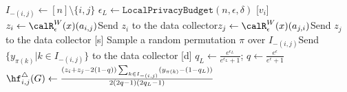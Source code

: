 \setlength{\algomargin}{5mm}
\begin{algorithm}[t]
  \SetAlgoLined
  $I_{-(i,j)} \leftarrow [n]\setminus\{i,j\}$\;
  $\epsilon_L \leftarrow \texttt{LocalPrivacyBudget}(n,\epsilon,\delta)$\;
  [$v_i$] $z_i \leftarrow \calR_{\epsilon}^W(x)(a_{i,j})$\;
  [$v_i$] Send $z_i$ to the data collector\;
  [$v_j$] $z_j \leftarrow \calR_{\epsilon}^W(x)(a_{j,i})$\;
  [$v_j$] Send $z_j$ to the data collector\;
  [s] Sample a random permutation $\pi$ over $I_{-(i,j)}$\;
  [s] Send $\{y_{\pi(k)} | k \in I_{-(i,j)}\}$ to the data collector\;
  [d] $q_L \leftarrow \frac{e^{\epsilon_L}}{e^{\epsilon_L}+1}$; $q \leftarrow \frac{e^\epsilon}{e^\epsilon+1}$\;
  [d] $\hf_{i,j}^\triangle(G) \leftarrow \frac{(z_i+z_j-2(1-q))\sum_{k \in I_{-(i,j)}} (y_{\pi(k)} - (1-q_L))}{2(2q-1)(2q_L-1)}$\;
  \caption{\AlgWSLE{} 
  (Wedge Shuffling with Local Edges). 
  [$v_i$], [s], and [d] represent that the process is run by user $v_i$, the shuffler, and the data collector, respectively. 
  }\label{chap3-alg:WSLE}
\end{algorithm}

